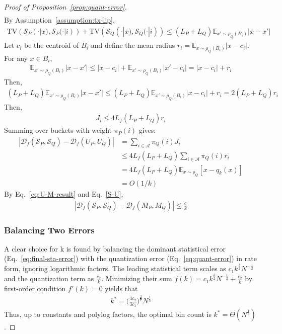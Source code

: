 \documentclass{article}
\theoremstyle{plain}
\theoremstyle{definition}
\theoremstyle{remark}
\begin{document}
\begin{proof}[Proof of Proposition~\ref{prop:quant-error}]
\begin{align}
\end{align}
By Assumption~\ref{assumption:tx-lip}, 
\begin{align}
    \text{TV}(\mathcal{S}_P(\cdot|x),\mathcal{S}_P(\cdot|i)) + \text{TV}(\mathcal{S}_Q(\cdot|x),\mathcal{S}_Q(\cdot|i))\le (L_P+L_Q)\mathbb{E}_{x'\sim\rho_Q( B_i)}|x-x'|
\end{align}
Let $c_i$ be the centroid of $B_i$ and define the mean radius $r_i = \mathbb{E}_{x\sim \rho_Q(B_i)}|x-c_i|$. For any $x\in B_i$,
\begin{align}
    \mathbb{E}_{x'\sim \rho_Q(B_i)}|x-x'| \le |x-c_i|+ \mathbb{E}_{x'\sim \rho_Q(B_i)}|x'-c_i|=|x-c_i|+r_i
\end{align}
Then,
\begin{align}
    (L_P+L_Q)\mathbb{E}_{x'\sim \rho_Q(B_i)}|x-x'| \le (L_P+L_Q)\mathbb{E}_{x'\sim \rho_Q(B_i)}|x-c_i|+r_i = 2(L_P+L_Q)r_i
\end{align}
Then,
\begin{align}
    J_i \le 4L_f(L_P+L_Q)r_i
\end{align}
Summing over buckets with weight $\pi_P(i)$ gives:
\begin{align}
    |\mathcal{D}_f(\mathcal{S}_P,\mathcal{S}_Q)-\mathcal{D}_f(U_P,U_Q)| &= \sum_{i\in \mathcal{A}}  \pi_Q(i) J_i \\
    &\le 4L_f(L_P+L_Q)\sum_{i\in \mathcal{A}}\pi_Q(i)  r_i\\
    & = 4L_f(L_P+L_Q) \mathbb{E}_{x \sim \rho_Q} [x-q_k(x)]\\
    &=O(1/k) \label{S-U}
\end{align}
By Eq.~\ref{eq:U-M-result} and Eq.~\ref{S-U}, 
\begin{align}
|\mathcal{D}_f(\mathcal{S}_P,\mathcal{S}_Q)-\mathcal{D}_f(M_P,M_Q)|\le \frac{c}{k} \label{eq:quant-error}
\end{align}

\subsubsection{Balancing Two Errors}
A clear choice for k is found by balancing the dominant statistical error (Eq.~\ref{eq:final-sta-error}) with the quantization error (Eq.~\ref{eq:quant-error}) in rate form, ignoring logarithmic factors. The leading statistical term scales as $c_1 k^{\frac{3}{2}}N^{-\frac{1}{2}}$ and the quantization term as $\frac{c_2}{k}$. Minimizing their sum $f(k)=c_1 k^{\frac{3}{2}}N^{-\frac{1}{2}}+\frac{c_2}{k}$  by first-order condition $f'(k)=0$ yields that 
\begin{align}
    k^* = \Big( \frac{4c_2}{3c_1}\Big)^{\frac{2}{7}}N^{\frac{1}{5}}
\end{align}
Thus, up to constants and polylog factors, the optimal bin count is $k^* = \Theta(N^{\frac{1}{5}})$.
\end{proof}
\end{document}
